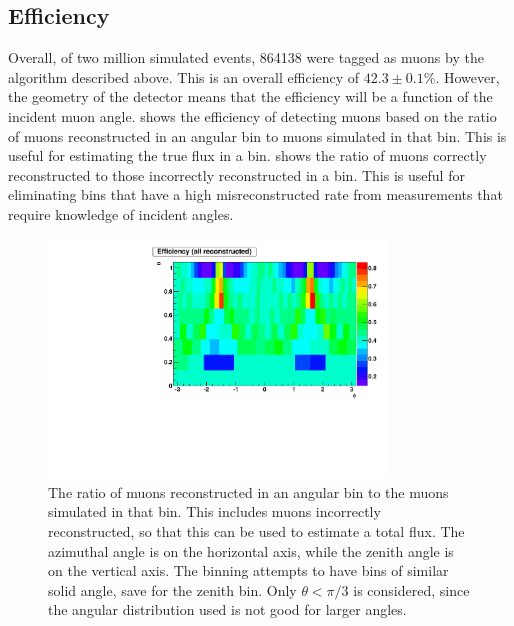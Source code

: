 \documentclass[herrin-thesis.tex]{subfiles}
\begin{document}
\subsection{Efficiency}
Overall, of two million simulated events, 864138 were tagged as muons by the algorithm described above. This is an overall efficiency of \(42.3 \pm 0.1\)\%. However, the geometry of the detector means that the efficiency will be a function of the incident muon angle.  shows the efficiency of detecting muons based on the ratio of muons reconstructed in an angular bin to muons simulated in that bin. This is useful for estimating the true flux in a bin.  shows the ratio of muons correctly reconstructed to those incorrectly reconstructed in a bin. This is useful for eliminating bins that have a high misreconstructed rate from measurements that require knowledge of incident angles.

 \begin{figure}[htpb]
 \centering
 \includegraphics[width=0.8\textwidth]{./plots/muon_efficiency.pdf}
 \caption[Efficiency of reconstructing muons as a function of angle]{The ratio of muons reconstructed in an angular bin to the muons simulated in that bin. This includes muons incorrectly reconstructed, so that this can be used to estimate a total flux. The azimuthal angle is on the horizontal axis, while the zenith angle is on the vertical axis. The binning attempts to have bins of similar solid angle, save for the zenith bin. Only \(\theta < \pi/3\) is considered, since the angular distribution used is not good for larger angles.}
 \label{fig:muon_efficiency}
 \end{figure}
\end{document}
